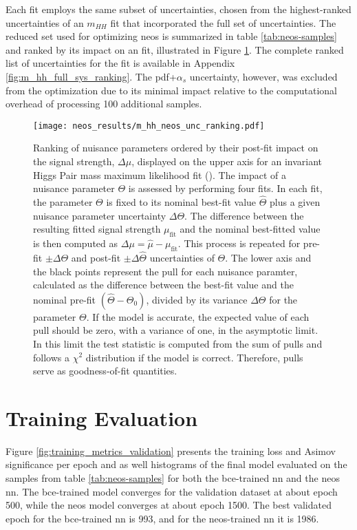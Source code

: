 Each fit employs the same subset of uncertainties, chosen from the highest-ranked uncertainties of an $m_{HH}$ fit that incorporated the full set of uncertainties. The reduced set used for optimizing \ac{neos} is summarized in table \ref{tab:neos-samples} and ranked by its impact on an \mhh fit, illustrated in Figure \ref{fig:m_hh_neos_unc_ranking}. The complete ranked list of uncertainties for the \mhh fit is available in Appendix \ref{fig:m_hh_full_sys_ranking}. The \ac{pdf}+$\alpha_s$ uncertainty, however, was excluded from the optimization due to its minimal impact relative to the computational overhead of processing 100 additional samples.


\begin{figure}
    \centering
    \texttt{[image: neos\_results/m\_hh\_neos\_unc\_ranking.pdf]}
    \caption[]{Ranking of nuisance parameters ordered by their post-fit impact on the signal strength, $\Delta\mu$, displayed on the upper axis for an invariant Higgs Pair mass maximum likelihood fit (\mhh{}). The impact of a nuisance parameter $\Theta$ is assessed by performing four fits. In each fit, the parameter $\Theta$ is fixed to its nominal best-fit value $\hat{\Theta}$ plus a given nuisance parameter uncertainty $\Delta\Theta$. The difference between the resulting fitted signal strength $\mu_\text{fit}$ and the nominal best-fitted value is then computed as $\Delta\mu=\hat{\mu} - \mu_\text{fit}$. This process is repeated for pre-fit $\pm\Delta\Theta$ and post-fit $\pm\Delta\hat{\Theta}$ uncertainties of $\Theta$. The lower axis and the black points represent the pull for each nuisance paramter, calculated as the difference between the best-fit value and the nominal pre-fit $(\hat{\Theta} - \Theta_0)$, divided by its variance $\Delta\Theta$ for the parameter $\Theta$. If the model is accurate, the expected value of each pull should be zero, with a variance of one, in the asymptotic limit. In this limit the test statistic is computed from the sum of pulls and follows a $\chi^2$ distribution if the model is correct. Therefore, pulls serve as goodness-of-fit quantities. }
    \label{fig:m_hh_neos_unc_ranking}
\end{figure}

\section{Training Evaluation}
Figure \ref{fig:training_metrics_validation} presents the training loss and Asimov significance per epoch and as well histograms of the final model evaluated on the samples from table \ref{tab:neos-samples} for both the \ac{bce}-trained \ac{nn} and the neos \ac{nn}. The \ac{bce}-trained model converges for the validation dataset at about epoch 500, while the \ac{neos} model converges at about epoch 1500. The best validated epoch for the \ac{bce}-trained \ac{nn} is 993, and for the \ac{neos}-trained \ac{nn} it is 1986.


